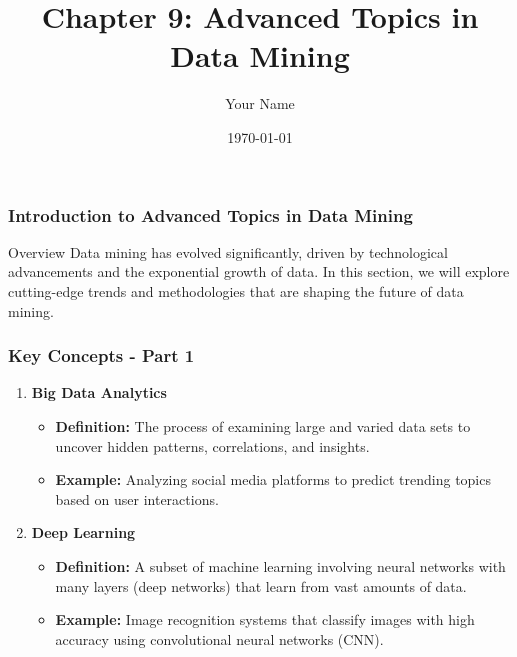 \documentclass{beamer}
\title{Chapter 9: Advanced Topics in Data Mining}
\author{Your Name}
\institute{Your Institution}
\date{\today}
\begin{document}
\frame{\titlepage}

\begin{frame}[fragile]
    \frametitle{Introduction to Advanced Topics in Data Mining}
    \begin{block}{Overview}
        Data mining has evolved significantly, driven by technological advancements and the exponential growth of data. In this section, we will explore cutting-edge trends and methodologies that are shaping the future of data mining.
    \end{block}
\end{frame}

\begin{frame}[fragile]
    \frametitle{Key Concepts - Part 1}
    \begin{enumerate}
        \item \textbf{Big Data Analytics}
        \begin{itemize}
            \item \textbf{Definition:} The process of examining large and varied data sets to uncover hidden patterns, correlations, and insights.
            \item \textbf{Example:} Analyzing social media platforms to predict trending topics based on user interactions.
        \end{itemize}

        \item \textbf{Deep Learning}
        \begin{itemize}
            \item \textbf{Definition:} A subset of machine learning involving neural networks with many layers (deep networks) that learn from vast amounts of data.
            \item \textbf{Example:} Image recognition systems that classify images with high accuracy using convolutional neural networks (CNN).
        \end{itemize}
    \end{enumerate}
\end{frame}
\end{document}
